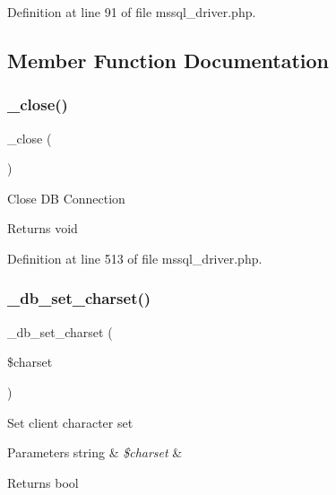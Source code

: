 Definition at line 91 of file mssql\+\_\+driver.\+php.



\subsection{Member Function Documentation}
\mbox{\label{class_c_i___d_b__mssql__driver_a4d9082658000e5ede8312067c6dda9db}} 
\subsubsection{\texorpdfstring{\_close()}{\_close()}}
{\footnotesize\ttfamily \+\_\+close (\begin{DoxyParamCaption}{ }\end{DoxyParamCaption})\hspace{0.3cm}{\ttfamily [protected]}}

Close DB Connection

\begin{DoxyReturn}{Returns}
void 
\end{DoxyReturn}


Definition at line 513 of file mssql\+\_\+driver.\+php.

\mbox{\label{class_c_i___d_b__mssql__driver_a2b808d420d8e9fea0b73ad7127f5efb8}} 
\subsubsection{\texorpdfstring{\_db\_set\_charset()}{\_db\_set\_charset()}}
{\footnotesize\ttfamily \+\_\+db\+\_\+set\+\_\+charset (\begin{DoxyParamCaption}\item[{}]{\$charset }\end{DoxyParamCaption})\hspace{0.3cm}{\ttfamily [protected]}}

Set client character set


\begin{DoxyParams}[1]{Parameters}
string & {\em \$charset} & \\
\hline
\end{DoxyParams}
\begin{DoxyReturn}{Returns}
bool 
\end{DoxyReturn}


